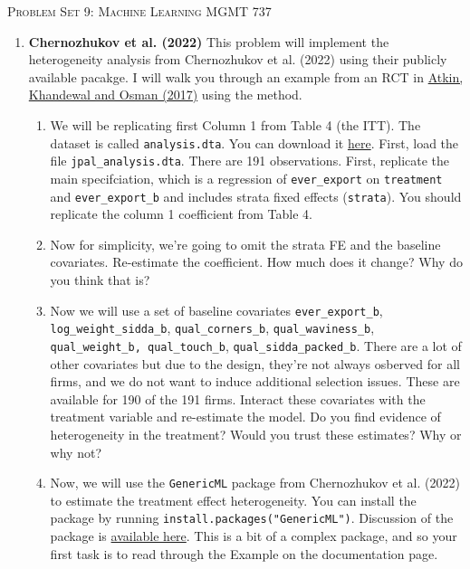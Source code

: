 \documentclass[11pt, a4paper]{article}
\begin{document}
\begin{center}
  {\Large \textsc{Problem Set 9: Machine Learning}}
  MGMT 737
\end{center}
\begin{enumerate}
    \item \textbf{Chernozhukov et al. (2022)}
This problem will implement the heterogeneity analysis from Chernozhukov et al. (2022) using their publicly available pacakge. I will walk you through an example from an RCT in \href{https://academic.oup.com/qje/article/132/2/551/3002609#173480323}{Atkin, Khandewal and Osman (2017)} using the method.
\begin{enumerate}
    \item We will be replicating first Column 1 from Table 4 (the ITT). The dataset is called \texttt{analysis.dta}. You can download it \href{https://s3.amazonaws.com/file.paulgp.com/30d/jpal_analysis.dta}{here}.
    First, load the file \texttt{jpal\_analysis.dta}. There are 191 observations. First, replicate the main specifciation, which is a regression of \texttt{ever\_export} on \texttt{treatment} and \texttt{ever\_export\_b} and includes strata fixed effects (\texttt{strata}). You should  replicate the column 1 coefficient from Table 4.
    \item Now for simplicity, we're going to omit the strata FE and the baseline covariates. Re-estimate the coefficient. How much does it change? Why do you think that is? 
    \item Now we will use a set of baseline covariates \texttt{ever\_export\_b}, \texttt{log\_weight\_sidda\_b}, \texttt{qual\_corners\_b}, \texttt{qual\_waviness\_b}, \texttt{qual\_weight\_b, qual\_touch\_b},  \texttt{qual\_sidda\_packed\_b}. There are a lot of other covariates but due to the design, they're not always osberved for all firms, and we do not want to induce additional selection issues. These are available for 190 of the 191 firms. Interact these covariates with the treatment variable and re-estimate the model. Do you find evidence of heterogeneity in the treatment? Would you trust these estimates? Why or why not?
    \item Now, we will use the \texttt{GenericML} package from Chernozhukov et al. (2022) to estimate the treatment effect heterogeneity. You can install the package by running \texttt{install.packages("GenericML")}. Discussion of the package is \href{https://github.com/mwelz/GenericML}{available here}. This is a bit of a complex package, and so your first task is to read through the Example on the documentation page. \\

\end{enumerate}
\end{enumerate}
\end{document}
